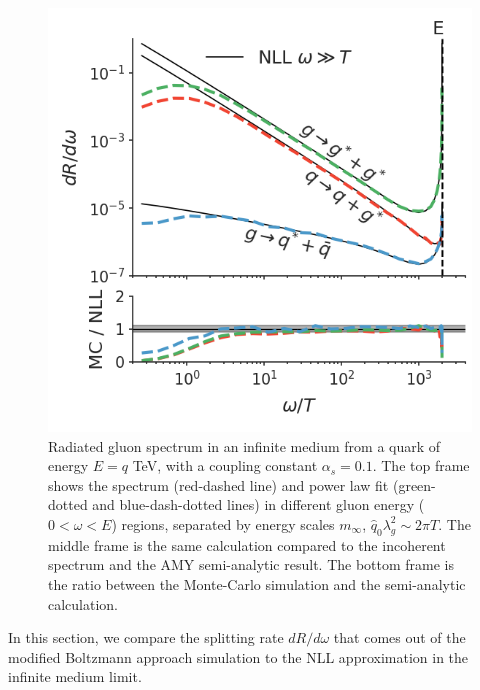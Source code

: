\documentclass[aps, prc, reprint, amsmath, groupedaddress, nofootinbib]{revtex4-1}
\begin{document}
\begin{figure}
\includegraphics[width=\columnwidth]{channel_rate.png}
\caption{Radiated gluon spectrum in an infinite medium from a quark of energy $E=q$ TeV, with a coupling constant $\alpha_s = 0.1$. The top frame shows the spectrum (red-dashed line) and power law fit (green-dotted and blue-dash-dotted lines) in different gluon energy ($0<\omega < E$) regions, separated by energy scales $m_\infty$, $\hat{q}_0\lambda_g^2 \sim 2\pi T$. The middle frame is the same calculation compared to the incoherent spectrum and the AMY semi-analytic result. The bottom frame is the ratio between the Monte-Carlo simulation and the semi-analytic calculation.}
\label{fig:spectrum}
\end{figure}
In this section, we compare the splitting rate $dR/d\omega$ that comes out of the modified Boltzmann approach simulation to the NLL approximation in the infinite medium limit.
\end{document}
